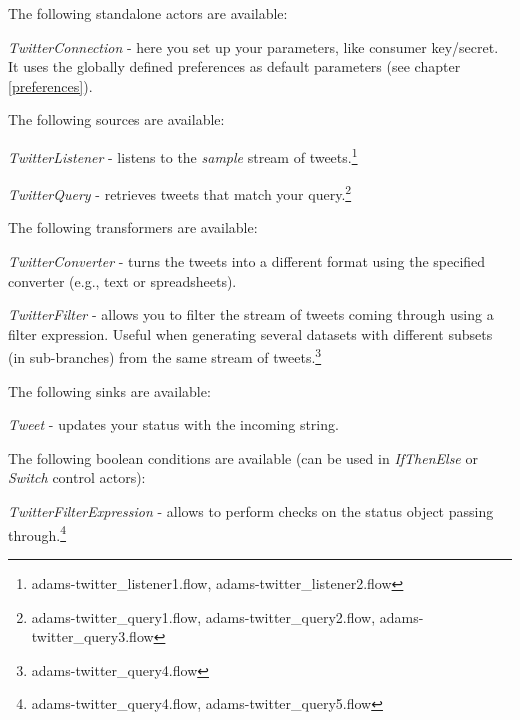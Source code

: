 \documentclass[a4paper]{book}
\begin{document}
\noindent The following standalone actors are available:
\begin{tight_itemize}
	\item \textit{TwitterConnection} - here you set up your parameters, like 
	consumer key/secret. It uses the globally defined preferences as default
	parameters (see chapter \ref{preferences}).
\end{tight_itemize}

\noindent The following sources are available:
\begin{tight_itemize}
	\item \textit{TwitterListener} - listens to the \textit{sample} stream
	of tweets.\footnote{adams-twitter\_listener1.flow, adams-twitter\_listener2.flow}
	\item \textit{TwitterQuery} - retrieves tweets that match your 
	query.\footnote{adams-twitter\_query1.flow, adams-twitter\_query2.flow, adams-twitter\_query3.flow}
\end{tight_itemize}

\noindent The following transformers are available:
\begin{tight_itemize}
	\item \textit{TwitterConverter} - turns the tweets into a different format
	using the specified converter (e.g., text or spreadsheets).
	\item \textit{TwitterFilter} - allows you to filter the stream of tweets
	coming through using a filter expression. Useful when generating several
	datasets with different subsets (in sub-branches) from the same stream 
	of tweets.\footnote{adams-twitter\_query4.flow}
\end{tight_itemize}

\noindent The following sinks are available:
\begin{tight_itemize}
	\item \textit{Tweet} - updates your status with the incoming string.
\end{tight_itemize}

\noindent The following boolean conditions are available (can be used in 
\textit{IfThenElse} or \textit{Switch} control actors):
\begin{tight_itemize}
	\item \textit{TwitterFilterExpression} - allows to perform checks on the 
	status object passing through.\footnote{adams-twitter\_query4.flow, adams-twitter\_query5.flow}
\end{tight_itemize}

\end{document}
